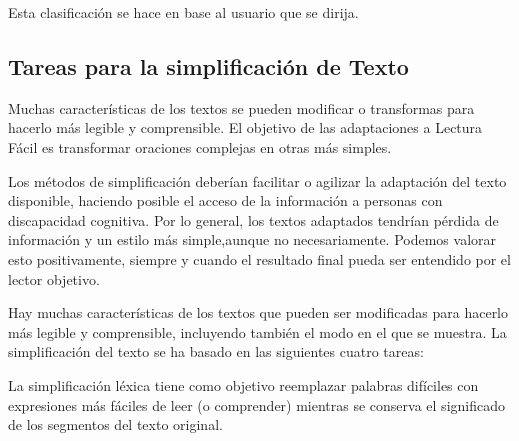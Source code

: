 Esta clasificación se hace en base al usuario que se dirija.



\subsection{Tareas para la simplificación de Texto}

Muchas características de los textos se pueden modificar o transformas para hacerlo más legible y comprensible. El objetivo de las adaptaciones a Lectura Fácil es transformar oraciones complejas en otras más simples.\citep{HoracioSaggion} 




Los métodos de simplificación deberían facilitar o agilizar la adaptación del texto disponible, haciendo posible el acceso de la información a personas con discapacidad cognitiva. Por lo general, los textos adaptados tendrían pérdida de información y un estilo más simple,aunque no necesariamente. Podemos valorar esto positivamente, siempre y cuando el resultado final pueda ser entendido por el lector objetivo. 


Hay muchas características de los textos que pueden ser modificadas para hacerlo más legible y comprensible, incluyendo también el modo en el que se muestra. La simplificación del texto se ha basado en las siguientes cuatro tareas:  


La simplificación léxica tiene como objetivo reemplazar palabras difíciles con expresiones más fáciles de leer (o comprender) mientras se conserva el significado de los segmentos del texto original.



